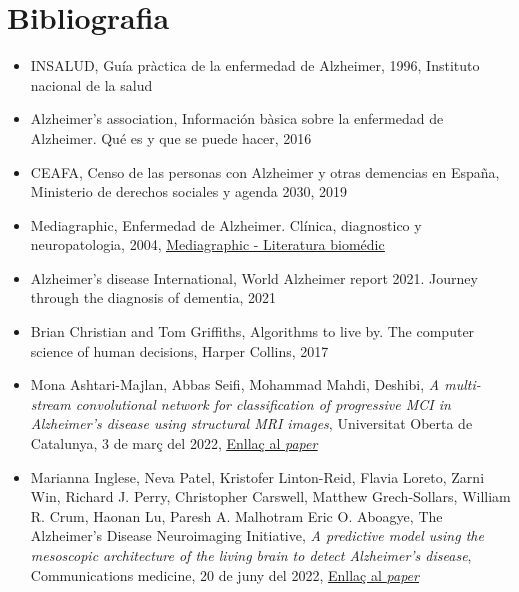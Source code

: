 \documentclass[a4paper,12pt]{report}
\begin{document}
\chapter*{Bibliografia}
\begin{itemize}
    \item INSALUD, Guía pràctica de la enfermedad de Alzheimer, 1996, Instituto nacional de la salud
    \item Alzheimer’s association, Información bàsica sobre la enfermedad de Alzheimer. Qué es y que se puede hacer, 2016
    \item CEAFA, Censo de las personas con Alzheimer y otras demencias en España, Ministerio de derechos sociales y agenda 2030, 2019
    \item Mediagraphic, Enfermedad de Alzheimer. Clínica, diagnostico y neuropatologia, 2004, \href{https://www.medigraphic.com/newMedi/}{\underline{Mediagraphic - Literatura biomédic}}
    \item Alzheimer’s disease International, World Alzheimer report 2021. Journey through the diagnosis of dementia, 2021
    \item Brian Christian and Tom Griffiths, Algorithms to live by. The computer science of human decisions, Harper Collins, 2017
    \item Mona Ashtari-Majlan, Abbas Seifi, Mohammad Mahdi, Deshibi, \textit{A multi-stream convolutional network for classification of progressive MCI in Alzheimer's disease using structural MRI images}, Universitat Oberta de Catalunya, 3 de març del 2022, \href{https://arxiv.org/abs/2203.01944}{\underline{Enllaç al \textit{paper}}}
    \item Marianna Inglese, Neva Patel, Kristofer Linton-Reid, Flavia Loreto, Zarni Win, Richard J. Perry, Christopher Carswell, Matthew Grech-Sollars, William R. Crum, Haonan Lu, Paresh A. Malhotram Eric O. Aboagye, The Alzheimer's Disease Neuroimaging Initiative, \textit{A predictive model using the mesoscopic architecture of the living brain to detect Alzheimer's disease}, Communications medicine, 20 de juny del 2022, \href{https://www.nature.com/articles/s43856-022-00133-4}{\underline{Enllaç al \textit{paper}}}
\end{itemize}
\end{document}
